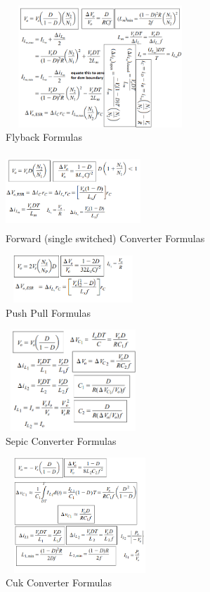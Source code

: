 \documentclass[twocolumn, ]{article}
\begin{document}
\begin{figure}[!ht]
	\includegraphics[width=2.8in,height=1.8in]{flybackformulasfromhart.png}
	\caption{Flyback Formulas}
\end{figure}
\begin{figure}[!ht]
	\includegraphics[width=2in,height=1.1in]{forwardsingleswitch.png}
	\caption{Forward (single switched) Converter Formulas}
\end{figure}
\begin{figure}[!ht]
	\includegraphics[width=2in,height=0.7in]{pushpull_someformulas.png}
	\caption{Push Pull Formulas}
\end{figure}




\begin{figure}[!ht]
	\includegraphics[width=2in,height=1.5in]{sepicformulas.png}
	\caption{Sepic Converter Formulas}
\end{figure}
\begin{figure}[!ht]
	\includegraphics[width=2.2in,height=1.7in]{cukformulas.png}
	\caption{Cuk Converter Formulas}
\end{figure}
\end{document}
